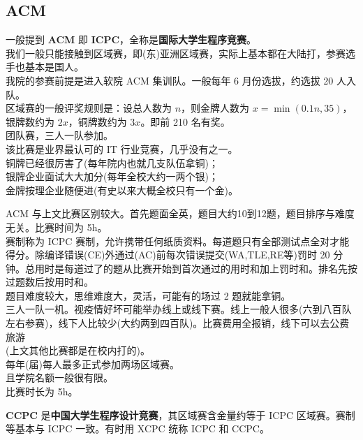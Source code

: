 \documentclass{beamer}
\begin{document}
\subsection{ACM}
\begin{frame}
    一般提到 \textbf{\color[RGB]{34, 166, 242}ACM} 即 \textbf{\color[RGB]{34, 166, 242}ICPC}，全称是\textbf{国际大学生程序竞赛}。\\
    我们一般只能接触到区域赛，即(东)亚洲区域赛，实际上基本都在大陆打，参赛选手也基本是国人。\\
    我院的参赛前提是进入软院 ACM 集训队。一般每年 6 月份选拔，约选拔 20 人入队。\\
    区域赛的一般评奖规则是：设总人数为 $n$，则金牌人数为 $x=\min(0.1n, 35)$，银牌数约为 $2x$，铜牌数约为 $3x$。即前 210 名有奖。\\
    团队赛，三人一队参加。\\
    该比赛是业界最认可的 IT 行业竞赛，几乎没有之一。\\
    铜牌已经很厉害了(每年院内也就几支队伍拿铜)；\\
    银牌企业面试大大加分(每年全校大约一两个银)；\\
    金牌按理企业随便进(有史以来大概全校只有一个金)。
\end{frame}

\begin{frame}
    ACM 与上文比赛区别较大。首先题面全英，题目大约10到12题，题目排序与难度无关。比赛时间为 5h。\\
    赛制称为 ICPC 赛制，允许携带任何纸质资料。每道题只有全部测试点全对才能得分。除编译错误(CE)外通过(AC)前每次错误提交(WA,TLE,RE等)罚时 20 分钟。总用时是每道过了的题从比赛开始到首次通过的用时和加上罚时和。排名先按过题数后按用时和。\\
    题目难度较大，思维难度大，灵活，可能有的场过 2 题就能拿铜。\\
    三人一队一机。视疫情好坏可能举办线上或线下赛。线上一般人很多(六到八百队左右参赛)，线下人比较少(大约两到四百队)。比赛费用全报销，线下可以去公费旅游\\(上文其他比赛都是在校内打的)。\\
    每年(届)每人最多正式参加两场区域赛。\\且学院名额一般很有限。\\
    比赛时长为 5h。
\end{frame}

\begin{frame}
    \textbf{\color[RGB]{34, 166, 242}CCPC} 是\textbf{中国大学生程序设计竞赛}，其区域赛含金量约等于 ICPC 区域赛。赛制等基本与 ICPC 一致。有时用 XCPC 统称 ICPC 和 CCPC。\\
\end{frame}
\end{document}
